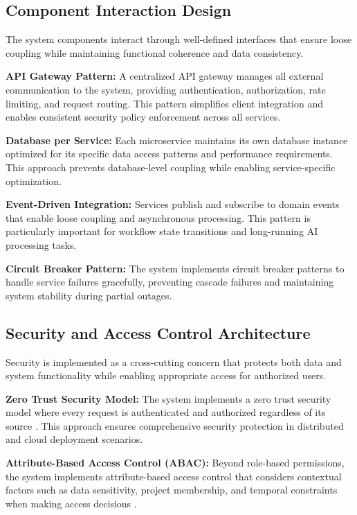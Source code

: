 \subsection{Component Interaction Design}

The system components interact through well-defined interfaces that ensure loose coupling while maintaining functional coherence and data consistency.

\textbf{API Gateway Pattern:} A centralized API gateway manages all external communication to the system, providing authentication, authorization, rate limiting, and request routing. This pattern simplifies client integration and enables consistent security policy enforcement across all services.

\textbf{Database per Service:} Each microservice maintains its own database instance optimized for its specific data access patterns and performance requirements. This approach prevents database-level coupling while enabling service-specific optimization.

\textbf{Event-Driven Integration:} Services publish and subscribe to domain events that enable loose coupling and asynchronous processing. This pattern is particularly important for workflow state transitions and long-running AI processing tasks.

\textbf{Circuit Breaker Pattern:} The system implements circuit breaker patterns to handle service failures gracefully, preventing cascade failures and maintaining system stability during partial outages.

\subsection{Security and Access Control Architecture}

Security is implemented as a cross-cutting concern that protects both data and system functionality while enabling appropriate access for authorized users.

\textbf{Zero Trust Security Model:} The system implements a zero trust security model where every request is authenticated and authorized regardless of its source \cite{rose2020zero}. This approach ensures comprehensive security protection in distributed and cloud deployment scenarios.

\textbf{Attribute-Based Access Control (ABAC):} Beyond role-based permissions, the system implements attribute-based access control that considers contextual factors such as data sensitivity, project membership, and temporal constraints when making access decisions \cite{hu2014guide}.

